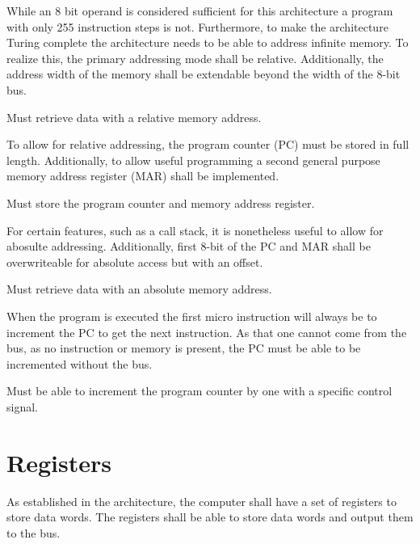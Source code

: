 While an 8 bit operand is considered sufficient for this architecture a program with only 255 instruction steps is not. Furthermore, to make the architecture Turing complete the architecture needs to be able to address infinite memory. To realize this, the primary addressing mode shall be relative. Additionally, the address width of the memory shall be extendable beyond the width of the 8-bit bus.

\begin{feat-requirement}
Must retrieve data with a relative memory address. 
\end{feat-requirement}

To allow for relative addressing, the program counter (PC) must be stored in full length. Additionally, to allow useful programming a second general purpose memory address register (MAR) shall be implemented. %

\begin{feat-requirement}
Must store the program counter and memory address register.
\end{feat-requirement}

For certain features, such as a call stack, it is nonetheless useful to allow for abosulte addressing. Additionally, first $8$-bit of the PC and MAR shall be overwriteable for absolute access but with an offset. 

\begin{feat-requirement}
Must retrieve data with an absolute memory address. 
\end{feat-requirement}


When the program is executed the first micro instruction will always be to increment the PC to get the next instruction. As that one cannot come from the bus, as no instruction or memory is present, the PC must be able to be incremented without the bus.
\begin{feat-requirement}
    Must be able to increment the program counter by one with a specific control signal.
\end{feat-requirement}

\iffalse
With relative jumps of only 255 but bigger word counts. 
Assembler could impl like jump over 

PSEUDO
NORMAL PROGRAM
JMP2
JPD 255 
NORMAL PROGRAM RESUMES HERE
.
.
.
SOME OTHER PROGRAM THAT NEEDS TO JUMP MORE THAN ONE

\fi

\section{Registers}
As established in the architecture, the computer shall have a set of registers to store data words. The registers shall be able to store data words and output them to the bus.

